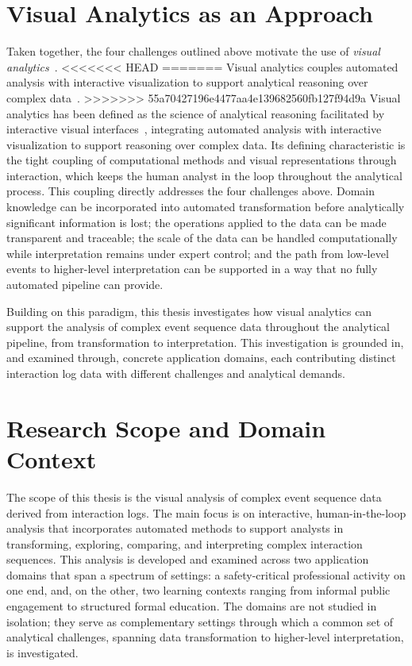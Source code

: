 \section{Visual Analytics as an Approach}

Taken together, the four challenges outlined above motivate the use of \textit{visual analytics}~\cite{thomas2005illuminating, keim2008visual}.
<<<<<<< HEAD
=======
Visual analytics couples automated analysis with interactive visualization to support analytical reasoning over complex data~\cite{thomas2005illuminating}.
>>>>>>> 55a70427196e4477aa4e139682560fb127f94d9a
Visual analytics has been defined as the science of analytical reasoning facilitated by interactive visual interfaces~\cite{thomas2005illuminating}, integrating automated analysis with interactive visualization to support reasoning over complex data.
Its defining characteristic is the tight coupling of computational methods and visual representations through interaction, which keeps the human analyst in the loop throughout the analytical process.
This coupling directly addresses the four challenges above.
Domain knowledge can be incorporated into automated transformation before analytically significant information is lost; the operations applied to the data can be made transparent and traceable; the scale of the data can be handled computationally while interpretation remains under expert control; and the path from low-level events to higher-level interpretation can be supported in a way that no fully automated pipeline can provide.

Building on this paradigm, this thesis investigates how visual analytics can support the analysis of complex event sequence data throughout the analytical pipeline, from transformation to interpretation.
This investigation is grounded in, and examined through, concrete application domains, each contributing distinct interaction log data with different challenges and analytical demands.





\section{Research Scope and Domain Context}

The scope of this thesis is the visual analysis of complex event sequence data derived from interaction logs.
The main focus is on interactive, human-in-the-loop analysis that incorporates automated methods to support analysts in transforming, exploring, comparing, and interpreting complex interaction sequences.
This analysis is developed and examined across two application domains that span a spectrum of settings: a safety-critical professional activity on one end, and, on the other, two learning contexts ranging from informal public engagement to structured formal education.
The domains are not studied in isolation; they serve as complementary settings through which a common set of analytical challenges, spanning data transformation to higher-level interpretation, is investigated.

